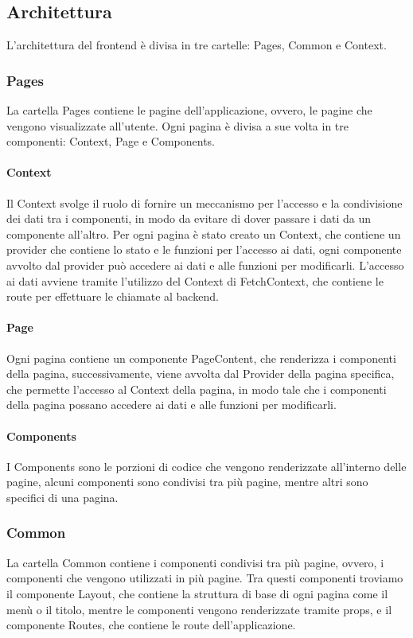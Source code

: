 \subsection{Architettura}
L'architettura del frontend è divisa in tre cartelle: Pages, Common e Context.

\subsubsection{Pages}
La cartella Pages contiene le pagine dell'applicazione, ovvero, le pagine che vengono visualizzate all'utente. Ogni pagina è divisa a sue volta in tre componenti: Context, Page e Components.\\

\paragraph{Context}
Il Context svolge il ruolo di fornire un meccanismo per l'accesso e la condivisione dei dati tra i componenti, in modo da evitare di dover passare i dati da un componente all'altro. Per ogni pagina è stato creato un Context, che contiene un provider che contiene lo stato e le funzioni per l'accesso ai dati, ogni componente avvolto dal provider può accedere ai dati e alle funzioni per modificarli. L'accesso ai dati avviene tramite l'utilizzo del Context di FetchContext, che contiene le route per effettuare le chiamate al backend.\\

\paragraph{Page}
Ogni pagina contiene un componente PageContent, che renderizza i componenti della pagina, successivamente, viene avvolta dal Provider della pagina specifica, che permette l'accesso al Context della pagina, in modo tale che i componenti della pagina possano accedere ai dati e alle funzioni per modificarli.\\

\paragraph{Components}
I Components sono le porzioni di codice che vengono renderizzate all'interno delle pagine, alcuni componenti sono condivisi tra più pagine, mentre altri sono specifici di una pagina.\\

\subsubsection{Common}
La cartella Common contiene i componenti condivisi tra più pagine, ovvero, i componenti che vengono utilizzati in più pagine. Tra questi componenti troviamo il componente Layout, che contiene la struttura di base di ogni pagina come il menù o il titolo, mentre le componenti vengono renderizzate tramite props, e il componente Routes, che contiene le route dell'applicazione.\\

